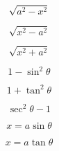 \documentclass{article}
\begin{document}
\[
\sqrt{a^2-x^2}
\]

\[
\sqrt{x^2-a^2}
\]

\[
\sqrt{x^2+a^2}
\]

\[
1-\sin^2\theta
\]

\[
1+\tan^2\theta
\]

\[
\sec^2\theta-1
\]

\[
x=a\sin\theta
\]

\[
x=a\tan\theta
\]
\end{document}
